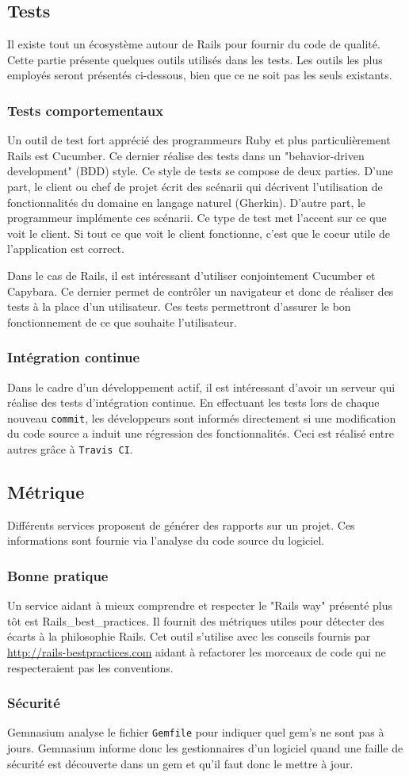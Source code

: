 \subsection{Tests}
\label{rails-tests}
Il existe tout un écosystème autour de Rails pour fournir du code de qualité. Cette partie présente quelques outils utilisés dans les tests. Les outils les plus employés seront présentés ci-dessous, bien que ce ne soit pas les seuls existants.

\subsubsection{Tests comportementaux}
\label{cucumber}
Un outil de test fort apprécié des programmeurs Ruby et plus particulièrement Rails est Cucumber. Ce dernier réalise des tests dans un "behavior-driven development" (BDD) style. Ce style de tests se compose de deux parties. D'une part, le client ou chef de projet écrit des scénarii qui décrivent l'utilisation de fonctionnalités du domaine en langage naturel (Gherkin). D'autre part, le programmeur implémente ces scénarii. Ce type de test met l'accent sur ce que voit le client. Si tout ce que voit le client fonctionne, c'est que le coeur utile de l'application est correct. 

Dans le cas de Rails, il est intéressant d'utiliser conjointement Cucumber et Capybara. Ce dernier permet de contrôler un navigateur et donc de réaliser des tests à la place d'un utilisateur. Ces tests permettront d'assurer le bon fonctionnement de ce que souhaite l'utilisateur.

\subsubsection{Intégration continue}
\label{travis}
Dans le cadre d'un développement actif, il est intéressant d'avoir un serveur qui réalise des tests d'intégration continue. En effectuant les tests lors de chaque nouveau \texttt{commit}, les développeurs sont informés directement si une modification du code source a induit une régression des fonctionnalités. Ceci est réalisé entre autres grâce à \texttt{Travis CI}.

\subsection{Métrique} 
Différents services proposent de générer des rapports sur un projet. Ces informations sont fournie via l'analyse du code source du logiciel.
\subsubsection{Bonne pratique} %
Un service aidant à mieux comprendre et respecter le "Rails way" présenté plus tôt est Rails\_best\_practices. Il fournit des métriques utiles pour détecter des écarts à la philosophie Rails. Cet outil s'utilise avec les conseils fournis par \url{http://rails-bestpractices.com} aidant à refactorer les morceaux de code qui ne respecteraient pas les conventions.
\subsubsection{Sécurité} %
Gemnasium analyse le fichier \texttt{Gemfile} pour indiquer quel gem's ne sont pas à jours. Gemnasium informe donc les gestionnaires d'un logiciel quand une faille de sécurité est découverte dans un gem et qu'il faut donc le mettre à jour.
